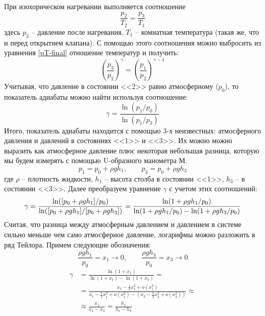 \documentclass[a4paper,12pt]{report}
\begin{document}
        При изохорическом нагревании выполняется соотношение
        \begin{equation}
            \frac{p_2}{T_2}=\frac{p_3}{T_1}   
        \end{equation}
        здесь $p_3$ -- давление после нагревания, $T_1$ -- комнатная температура (такая же, что и перед открытием клапана). С помощью этого соотношения можно выбросить из уравнения \eqref{pT-final} отношение температур и получить:
        \begin{equation}
            \label{P-final}
            \left(\frac{p_3}{p_2}\right)^\gamma = \left(\frac{p_1}{p_2}\right)^{\gamma-1}
        \end{equation}
        Учитывая, что давление в состоянии <<2>> равно атмосферному ($p_0$), то показатель адиабаты можно найти используя соотношение:
        \begin{equation}
            \label{gamma}
            \gamma = \frac{\ln(p_1/p_0)}{\ln(p_1/p_3)}
        \end{equation}
        Итого, показатель адиабаты находится с помощью 3-х неизвестных: атмосферного давления и давлений в состояниях <<1>> и <<3>>. Их можно можно выразить как атмосферное давление плюс некоторая небольшая разница, которую мы будем измерять с помощью U-образного манометра М.
        \begin{equation*}
            p_1=p_0+\rho gh_1, \qquad p_3=p_0+\rho gh_3
        \end{equation*}
        где $\rho$ -- плотность жидкости, $h_1$ -- высота столба в состоянии <<1>>, $h_3$ -- в состоянии <<3>>. Далее преобразуем уравнение $\gamma$ с учетом этих соотношений:
        \begin{equation*}
            \gamma=\frac{\ln([p_0+\rho gh_1]/p_0)}{\ln([p_0+\rho gh_1]/[p_0+\rho gh_3])}=\frac{\ln(1+\rho gh_1/p_0)}{\ln (1+\rho gh_1/p_0)-\ln(1+\rho gh_3/p_0)}\\ 
        \end{equation*}
        Считая, что разница между атмосферным давлением и давлением в системе сильно меньше чем само атмосферное давление, логарифмы можно разложить в ряд Тейлора. Примем следующие обозначения:
        \begin{equation*}
            \frac{\rho gh_1}{p_0}=x_1\rightarrow0, \qquad \frac{\rho g h_3}{p_0}=x_3\rightarrow 0
        \end{equation*}
        \begin{align}
            \nonumber \gamma&=\frac{\ln(1+x_1)}{\ln(1+x_1)-\ln(1+x_3)}=\\
            \nonumber&=\frac{x_1-\frac{1}{2}x_1^2+o(x_1^2)}{x_1-\frac{1}{2}x_1^2+o(x_1^2)-(x_3-\frac{1}{2}x_3^2+o(x_3^2))}\approx\\ 
            &\approx \frac{x_1}{x_1-x_3}=\frac{h_1}{h_1-h_3} \label{final gamma via h}
        \end{align}
\end{document}
